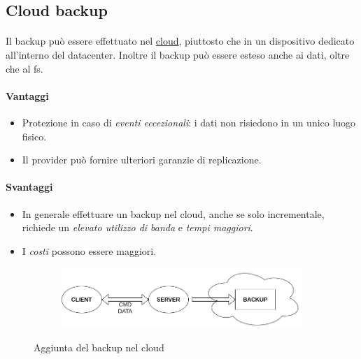 \documentclass[11pt,a4paper,english]{article}
\begin{document}
\subsection{Cloud backup}

\paragraph{} Il backup può essere effettuato nel \underline{cloud}, piuttosto che in un dispositivo dedicato all'interno del datacenter. Inoltre il backup può essere esteso anche ai dati, oltre che al fs. 

\paragraph{Vantaggi} \begin{itemize}
	\item Protezione in caso di \emph{eventi eccezionali}: i dati non risiedono in un unico luogo fisico.
	\item Il provider può fornire ulteriori garanzie di replicazione.
\end{itemize}

\paragraph{Svantaggi} \begin{itemize}
	\item In generale effettuare un backup nel cloud, anche se solo incrementale, richiede un \emph{elevato utilizzo di banda} e \emph{tempi maggiori}.
	\item I \emph{costi} possono essere maggiori.
\end{itemize}

\begin{figure}[H]
	\centering
	\begin{subfigure}{0.80\linewidth}
		\includegraphics[width=\linewidth]{../diagrams/architettura/3.png}
	\end{subfigure}
	\caption{Aggiunta del backup nel cloud}
\end{figure}
\end{document}
